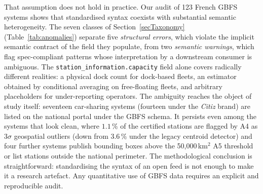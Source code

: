 \documentclass[11pt,a4paper]{article}
\begin{document}
That assumption does not hold in practice. Our audit of 123 French GBFS
systems shows that standardised syntax coexists with substantial semantic
heterogeneity. The
seven classes of Section~\ref{secTaxonomy} (Table~\ref{tab:anomalies})
separate five \emph{structural errors}, which violate the implicit
semantic contract of the field they populate, from two \emph{semantic
warnings}, which flag spec-compliant patterns whose interpretation by a
downstream consumer is ambiguous. The \texttt{station\_information.capacity} field alone covers radically
different realities: a physical dock count for dock-based fleets, an
estimator obtained by conditional averaging on free-floating fleets, and
arbitrary placeholders for under-reporting operators. The ambiguity
reaches the object of study itself: seventeen car-sharing systems
(fourteen under the \emph{Citiz} brand) are listed on the national portal
under the GBFS schema. It persists even among the systems that look
clean, where $1.1\,\%$ of the certified stations are flagged by A4 as
$3\sigma$ geospatial outliers (down from $3.6\,\%$ under the legacy
centroid detector) and four further systems publish bounding boxes above
the 50{,}000\,km$^2$ A5 threshold or list stations outside the national
perimeter. The methodological conclusion is straightforward: standardising
the syntax of an open feed is not enough to make it a research artefact.
Any quantitative use of GBFS data requires an explicit and reproducible
audit.
\end{document}

